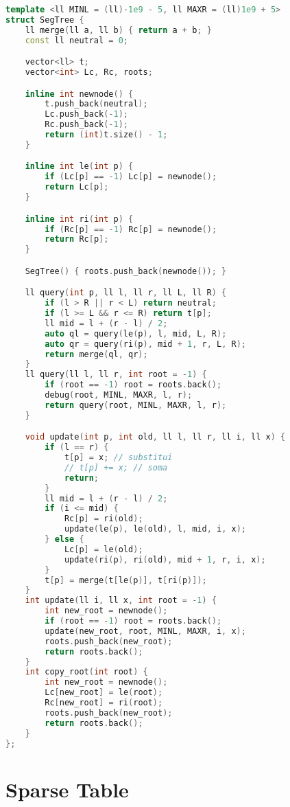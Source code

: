 \documentclass[10pt, a4paper, oneside]{book}
\begin{document}
\begin{lstlisting}[language=C++]
template <ll MINL = (ll)-1e9 - 5, ll MAXR = (ll)1e9 + 5>
struct SegTree {
    ll merge(ll a, ll b) { return a + b; }
    const ll neutral = 0;

    vector<ll> t;
    vector<int> Lc, Rc, roots;

    inline int newnode() {
        t.push_back(neutral);
        Lc.push_back(-1);
        Rc.push_back(-1);
        return (int)t.size() - 1;
    }

    inline int le(int p) {
        if (Lc[p] == -1) Lc[p] = newnode();
        return Lc[p];
    }

    inline int ri(int p) {
        if (Rc[p] == -1) Rc[p] = newnode();
        return Rc[p];
    }

    SegTree() { roots.push_back(newnode()); }

    ll query(int p, ll l, ll r, ll L, ll R) {
        if (l > R || r < L) return neutral;
        if (l >= L && r <= R) return t[p];
        ll mid = l + (r - l) / 2;
        auto ql = query(le(p), l, mid, L, R);
        auto qr = query(ri(p), mid + 1, r, L, R);
        return merge(ql, qr);
    }
    ll query(ll l, ll r, int root = -1) {
        if (root == -1) root = roots.back();
        debug(root, MINL, MAXR, l, r);
        return query(root, MINL, MAXR, l, r);
    }

    void update(int p, int old, ll l, ll r, ll i, ll x) {
        if (l == r) {
            t[p] = x; // substitui
            // t[p] += x; // soma
            return;
        }
        ll mid = l + (r - l) / 2;
        if (i <= mid) {
            Rc[p] = ri(old);
            update(le(p), le(old), l, mid, i, x);
        } else {
            Lc[p] = le(old);
            update(ri(p), ri(old), mid + 1, r, i, x);
        }
        t[p] = merge(t[le(p)], t[ri(p)]);
    }
    int update(ll i, ll x, int root = -1) {
        int new_root = newnode();
        if (root == -1) root = roots.back();
        update(new_root, root, MINL, MAXR, i, x);
        roots.push_back(new_root);
        return roots.back();
    }
    int copy_root(int root) {
        int new_root = newnode();
        Lc[new_root] = le(root);
        Rc[new_root] = ri(root);
        roots.push_back(new_root);
        return roots.back();
    }
};\end{lstlisting}
\hfill

\section{Sparse Table}
\end{document}

